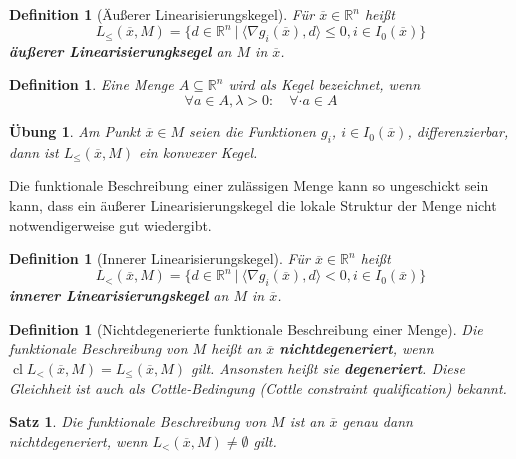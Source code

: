 \documentclass[11pt]{scrreprt}
\newcounter{thm}
\theoremstyle{thmstyle}
\numberwithin{thm}{section}
\newtheorem{definition}[thm]{Definition}
\newtheorem{satz}[thm]{Satz}
\newtheorem{uebung}[thm]{Übung}
\newtheorem*{definition*}{Definition}
\begin{document}
\begin{definition}[Äußerer Linearisierungskegel]
	Für $\overline{x} \in \mathbb{R}^n$ heißt 
		$$ L_{\leq}(\overline{x}, M) = \big\{ d \in \mathbb{R}^n ~|~\langle \nabla g_i(\overline{x}), d \rangle \leq 0, i \in I_0(\overline{x}) \big\} $$
	\textbf{äußerer Linearisierungksegel} an $M$ in $\overline{x}$.
\end{definition}

\begin{definition*}
	Eine Menge $A \subseteq \mathbb{R}^n$ wird als Kegel bezeichnet, wenn
	$$ \forall a \in A, \lambda > 0: \quad \forall \cdot a \in A $$
\end{definition*}

\begin{uebung}
	Am Punkt $\overline{x} \in M$ seien die Funktionen $g_i$, $i \in I_0(\overline{x})$, differenzierbar, dann ist $L_{\leq}(\overline{x}, M)$ ein konvexer Kegel.
\end{uebung}

Die funktionale Beschreibung einer zulässigen Menge kann so ungeschickt sein kann, dass ein äußerer Linearisierungskegel die lokale Struktur der Menge nicht notwendigerweise gut wiedergibt.

\setcounter{thm}{10}

\begin{definition}[Innerer Linearisierungskegel]
	Für $\overline{x} \in \mathbb{R}^n$ heißt
		$$ L_{<}(\overline{x}, M) = \big\{ d \in \mathbb{R}^n ~|~\langle \nabla g_i(\overline{x}), d \rangle < 0, i \in I_0(\overline{x}) \big\} $$
		\textbf{innerer Linearisierungskegel} an $M$ in $\overline{x}$.	
\end{definition}

\begin{definition}[Nichtdegenerierte funktionale Beschreibung einer Menge]
	Die funktionale Beschreibung von $M$ heißt an $\overline{x}$ \textbf{nichtdegeneriert}, wenn $\operatorname{cl} L_{<}(\overline{x}, M) = L_{\leq}(\overline{x}, M)$ gilt. Ansonsten heißt sie \textbf{degeneriert}. Diese Gleichheit ist auch als Cottle-Bedingung (Cottle constraint qualification) bekannt.
\end{definition}

\setcounter{thm}{14}

\begin{satz}
	Die funktionale Beschreibung von $M$ ist an $\overline{x}$ genau dann nichtdegeneriert, wenn $L_{<}(\overline{x}, M) \neq \emptyset$ gilt.	
\end{satz}
\end{document}
